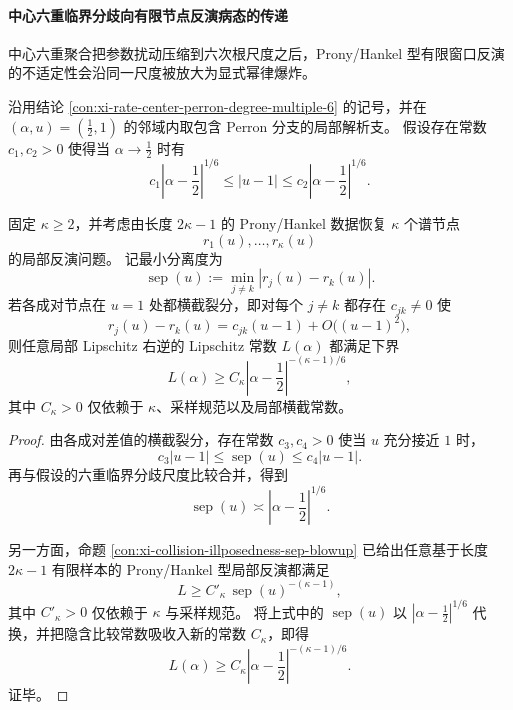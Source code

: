 \paragraph{中心六重临界分歧向有限节点反演病态的传递}
中心六重聚合把参数扰动压缩到六次根尺度之后，Prony/Hankel 型有限窗口反演的不适定性会沿同一尺度被放大为显式幂律爆炸。

\begin{theorem}\label{thm:xi-center-sixfold-kappa-node-inversion-blowup}
沿用结论 \ref{con:xi-rate-center-perron-degree-multiple-6} 的记号，并在 \((\alpha,u)=(\tfrac12,1)\) 的邻域内取包含 Perron 分支的局部解析支。
假设存在常数 \(c_1,c_2>0\) 使得当 \(\alpha\to \tfrac12\) 时有
\[
c_1\left|\alpha-\frac12\right|^{1/6}
\le
|u-1|
\le
c_2\left|\alpha-\frac12\right|^{1/6}.
\]

固定 \(\kappa\ge 2\)，并考虑由长度 \(2\kappa-1\) 的 Prony/Hankel 数据恢复 \(\kappa\) 个谱节点
\[
r_1(u),\dots,r_\kappa(u)
\]
的局部反演问题。
记最小分离度为
\[
\operatorname{sep}(u):=\min_{j\neq k}|r_j(u)-r_k(u)|.
\]
若各成对节点在 \(u=1\) 处都横截裂分，即对每个 \(j\neq k\) 都存在 \(c_{jk}\neq 0\) 使
\[
r_j(u)-r_k(u)=c_{jk}(u-1)+O\bigl((u-1)^2\bigr),
\]
则任意局部 Lipschitz 右逆的 Lipschitz 常数 \(L(\alpha)\) 都满足下界
\[
L(\alpha)\ge C_\kappa\left|\alpha-\frac12\right|^{-(\kappa-1)/6},
\]
其中 \(C_\kappa>0\) 仅依赖于 \(\kappa\)、采样规范以及局部横截常数。
\end{theorem}
\begin{proof}
由各成对差值的横截裂分，存在常数 \(c_3,c_4>0\) 使当 \(u\) 充分接近 \(1\) 时，
\[
c_3|u-1|
\le
\operatorname{sep}(u)
\le
c_4|u-1|.
\]
再与假设的六重临界分歧尺度比较合并，得到
\[
\operatorname{sep}(u)\asymp \left|\alpha-\frac12\right|^{1/6}.
\]

另一方面，命题 \ref{con:xi-collision-illposedness-sep-blowup} 已给出任意基于长度 \(2\kappa-1\) 有限样本的 Prony/Hankel 型局部反演都满足
\[
L\ge C'_\kappa\,\operatorname{sep}(u)^{-(\kappa-1)},
\]
其中 \(C'_\kappa>0\) 仅依赖于 \(\kappa\) 与采样规范。
将上式中的 \(\operatorname{sep}(u)\) 以 \(|\alpha-\tfrac12|^{1/6}\) 代换，并把隐含比较常数吸收入新的常数 \(C_\kappa\)，即得
\[
L(\alpha)\ge C_\kappa\left|\alpha-\frac12\right|^{-(\kappa-1)/6}.
\]
证毕。
\end{proof}
\endinput
